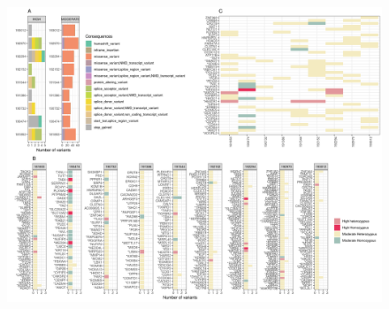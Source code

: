 \begin{figure}[ht]
\centering
\includegraphics[width=\linewidth]{fig/panel_WomenResults.png}
\caption{\textbf{}  }
\label{fig:reswomen}
\end{figure}

